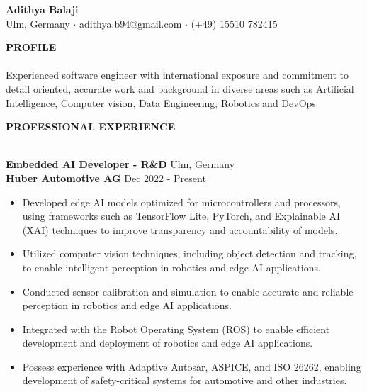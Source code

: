 \documentclass[11pt, a4paper]{article}
\newcommand{\lineunder} {
    \vspace*{-8pt} \\
    \hspace*{-18pt} \hrulefill \\
}
\newcommand{\header} [1] {
    {\hspace*{-18pt}\vspace*{6pt} \textsc{#1}}
    \vspace*{-6pt} \lineunder
}
\begin{document}
\vspace*{-20pt}

    


\begin{center}
	{\Huge {\textbf{Adithya Balaji}}}\\
	Ulm, Germany $\cdot$ adithya.b94@gmail.com $\cdot$ (+49) 15510 782415\\
\end{center}

\vspace{5mm}

\header {\textbf{PROFILE}}
\vspace{1mm}
Experienced software engineer with international exposure and commitment to detail oriented, accurate work and background in diverse areas such as Artificial Intelligence, Computer vision, Data Engineering, Robotics and DevOps 

\vspace{5mm}

\header{\textbf{PROFESSIONAL EXPERIENCE}}
\vspace{1mm}

\textbf{Embedded AI Developer - R\&D} \hfill Ulm, Germany\\

\textbf{Huber Automotive AG} \hfill Dec 2022 - Present\\
\begin{itemize} \itemsep 1pt
        \item Developed edge AI models optimized for microcontrollers and processors, using frameworks such as TensorFlow Lite, PyTorch, and Explainable AI (XAI) techniques to improve transparency and accountability of models.
        \item Utilized computer vision techniques, including object detection and tracking, to enable intelligent perception in robotics and edge AI applications.
        \item Conducted sensor calibration and simulation to enable accurate and reliable perception in robotics and edge AI applications.
        \item Integrated with the Robot Operating System (ROS) to enable efficient development and deployment of robotics and edge AI applications.
        \item Possess experience with Adaptive Autosar, ASPICE, and ISO 26262, enabling development of safety-critical systems for automotive and other industries.
\end{itemize}
\end{document}
